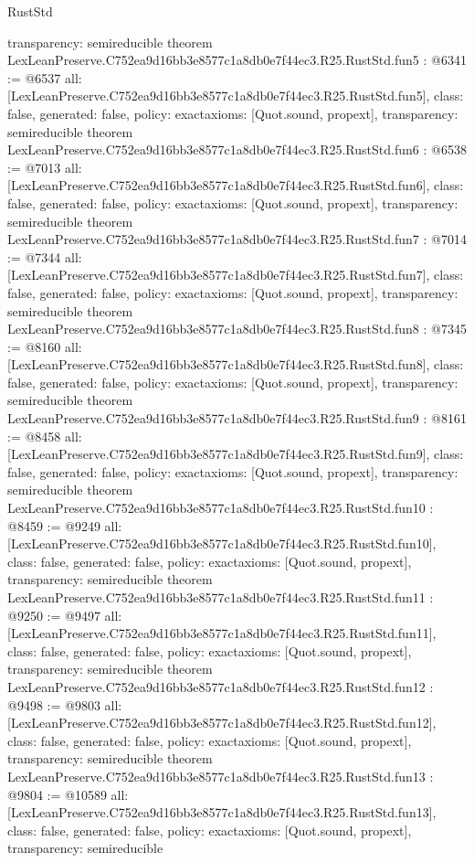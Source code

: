 \begin{lexlean}{RustStd}
\begin{coremodule}
{  transparency: semireducible
}
theorem LexLeanPreserve.C752ea9d16bb3e8577c1a8db0e7f44ec3.R25.RustStd.fun5 : @6341 := @6537 {
  all: [LexLeanPreserve.C752ea9d16bb3e8577c1a8db0e7f44ec3.R25.RustStd.fun5],
  class: false,
  generated: false,
  policy: exact{axioms: [Quot.sound, propext]},
  transparency: semireducible
}
theorem LexLeanPreserve.C752ea9d16bb3e8577c1a8db0e7f44ec3.R25.RustStd.fun6 : @6538 := @7013 {
  all: [LexLeanPreserve.C752ea9d16bb3e8577c1a8db0e7f44ec3.R25.RustStd.fun6],
  class: false,
  generated: false,
  policy: exact{axioms: [Quot.sound, propext]},
  transparency: semireducible
}
theorem LexLeanPreserve.C752ea9d16bb3e8577c1a8db0e7f44ec3.R25.RustStd.fun7 : @7014 := @7344 {
  all: [LexLeanPreserve.C752ea9d16bb3e8577c1a8db0e7f44ec3.R25.RustStd.fun7],
  class: false,
  generated: false,
  policy: exact{axioms: [Quot.sound, propext]},
  transparency: semireducible
}
theorem LexLeanPreserve.C752ea9d16bb3e8577c1a8db0e7f44ec3.R25.RustStd.fun8 : @7345 := @8160 {
  all: [LexLeanPreserve.C752ea9d16bb3e8577c1a8db0e7f44ec3.R25.RustStd.fun8],
  class: false,
  generated: false,
  policy: exact{axioms: [Quot.sound, propext]},
  transparency: semireducible
}
theorem LexLeanPreserve.C752ea9d16bb3e8577c1a8db0e7f44ec3.R25.RustStd.fun9 : @8161 := @8458 {
  all: [LexLeanPreserve.C752ea9d16bb3e8577c1a8db0e7f44ec3.R25.RustStd.fun9],
  class: false,
  generated: false,
  policy: exact{axioms: [Quot.sound, propext]},
  transparency: semireducible
}
theorem LexLeanPreserve.C752ea9d16bb3e8577c1a8db0e7f44ec3.R25.RustStd.fun10 : @8459 := @9249 {
  all: [LexLeanPreserve.C752ea9d16bb3e8577c1a8db0e7f44ec3.R25.RustStd.fun10],
  class: false,
  generated: false,
  policy: exact{axioms: [Quot.sound, propext]},
  transparency: semireducible
}
theorem LexLeanPreserve.C752ea9d16bb3e8577c1a8db0e7f44ec3.R25.RustStd.fun11 : @9250 := @9497 {
  all: [LexLeanPreserve.C752ea9d16bb3e8577c1a8db0e7f44ec3.R25.RustStd.fun11],
  class: false,
  generated: false,
  policy: exact{axioms: [Quot.sound, propext]},
  transparency: semireducible
}
theorem LexLeanPreserve.C752ea9d16bb3e8577c1a8db0e7f44ec3.R25.RustStd.fun12 : @9498 := @9803 {
  all: [LexLeanPreserve.C752ea9d16bb3e8577c1a8db0e7f44ec3.R25.RustStd.fun12],
  class: false,
  generated: false,
  policy: exact{axioms: [Quot.sound, propext]},
  transparency: semireducible
}
theorem LexLeanPreserve.C752ea9d16bb3e8577c1a8db0e7f44ec3.R25.RustStd.fun13 : @9804 := @10589 {
  all: [LexLeanPreserve.C752ea9d16bb3e8577c1a8db0e7f44ec3.R25.RustStd.fun13],
  class: false,
  generated: false,
  policy: exact{axioms: [Quot.sound, propext]},
  transparency: semireducible
}
\end{coremodule}
\end{lexlean}

